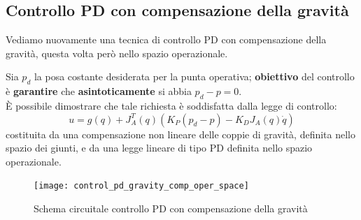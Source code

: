 \subsection{Controllo PD con compensazione della gravità}\label{section:pd_control_gravity_comp_join_space}
Vediamo nuovamente una tecnica di controllo PD con compensazione della gravità, questa volta però nello spazio operazionale.

Sia $p_d$ la posa costante desiderata per la punta operativa; \textbf{obiettivo} del controllo è \textbf{garantire} che \textbf{asintoticamente} si abbia $p_d - p = 0$.\\
È possibile dimostrare che tale richiesta è soddisfatta dalla legge di controllo:
\begin{equation}\label{eq:pd_gravity_comp_control_operational}
u = g(q) + J_A^T(q)(K_P(p_d - p) - K_DJ_A(q)\dot{q})
\end{equation}
costituita da una compensazione non lineare delle coppie di gravità, definita nello spazio dei giunti, e da una legge lineare di tipo PD definita nello spazio operazionale.


\begin{figure}[H]
	\centering
	\texttt{[image: control\_pd\_gravity\_comp\_oper\_space]}
	\caption{Schema circuitale controllo PD con compensazione della gravità}
	\label{fig:controlpdgravitycompoperspace}
\end{figure}


\vspace*{5pt}
